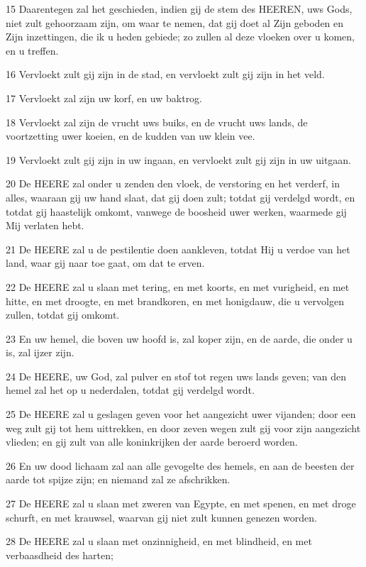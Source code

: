 \par 15 Daarentegen zal het geschieden, indien gij de stem des HEEREN, uws Gods, niet zult gehoorzaam zijn, om waar te nemen, dat gij doet al Zijn geboden en Zijn inzettingen, die ik u heden gebiede; zo zullen al deze vloeken over u komen, en u treffen.
\par 16 Vervloekt zult gij zijn in de stad, en vervloekt zult gij zijn in het veld.
\par 17 Vervloekt zal zijn uw korf, en uw baktrog.
\par 18 Vervloekt zal zijn de vrucht uws buiks, en de vrucht uws lands, de voortzetting uwer koeien, en de kudden van uw klein vee.
\par 19 Vervloekt zult gij zijn in uw ingaan, en vervloekt zult gij zijn in uw uitgaan.
\par 20 De HEERE zal onder u zenden den vloek, de verstoring en het verderf, in alles, waaraan gij uw hand slaat, dat gij doen zult; totdat gij verdelgd wordt, en totdat gij haastelijk omkomt, vanwege de boosheid uwer werken, waarmede gij Mij verlaten hebt.
\par 21 De HEERE zal u de pestilentie doen aankleven, totdat Hij u verdoe van het land, waar gij naar toe gaat, om dat te erven.
\par 22 De HEERE zal u slaan met tering, en met koorts, en met vurigheid, en met hitte, en met droogte, en met brandkoren, en met honigdauw, die u vervolgen zullen, totdat gij omkomt.
\par 23 En uw hemel, die boven uw hoofd is, zal koper zijn, en de aarde, die onder u is, zal ijzer zijn.
\par 24 De HEERE, uw God, zal pulver en stof tot regen uws lands geven; van den hemel zal het op u nederdalen, totdat gij verdelgd wordt.
\par 25 De HEERE zal u geslagen geven voor het aangezicht uwer vijanden; door een weg zult gij tot hem uittrekken, en door zeven wegen zult gij voor zijn aangezicht vlieden; en gij zult van alle koninkrijken der aarde beroerd worden.
\par 26 En uw dood lichaam zal aan alle gevogelte des hemels, en aan de beesten der aarde tot spijze zijn; en niemand zal ze afschrikken.
\par 27 De HEERE zal u slaan met zweren van Egypte, en met spenen, en met droge schurft, en met krauwsel, waarvan gij niet zult kunnen genezen worden.
\par 28 De HEERE zal u slaan met onzinnigheid, en met blindheid, en met verbaasdheid des harten;
